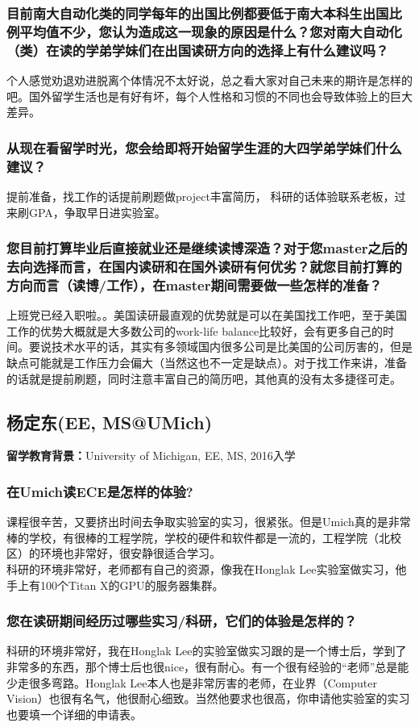 \documentclass[a4paper,UTF8]{book}
\begin{document}
    \subsubsection*{目前南大自动化类的同学每年的出国比例都要低于南大本科生出国比例平均值不少，您认为造成这一现象的原因是什么？您对南大自动化（类）在读的学弟学妹们在出国读研方向的选择上有什么建议吗？}
    个人感觉劝退劝进脱离个体情况不太好说，总之看大家对自己未来的期许是怎样的吧。国外留学生活也是有好有坏，每个人性格和习惯的不同也会导致体验上的巨大差异。

    \subsubsection*{从现在看留学时光，您会给即将开始留学生涯的大四学弟学妹们什么建议？}
    提前准备，找工作的话提前刷题做project丰富简历， 科研的话体验联系老板，过来刷GPA，争取早日进实验室。

    \subsubsection*{您目前打算毕业后直接就业还是继续读博深造？对于您master之后的去向选择而言，在国内读研和在国外读研有何优劣？就您目前打算的方向而言（读博/工作），在master期间需要做一些怎样的准备？}
    上班党已经入职啦。。美国读研最直观的优势就是可以在美国找工作吧，至于美国工作的优势大概就是大多数公司的work-life balance比较好，会有更多自己的时间。要说技术水平的话，其实有多领域国内很多公司是比美国的公司厉害的，但是缺点可能就是工作压力会偏大（当然这也不一定是缺点）。对于找工作来讲，准备的话就是提前刷题，同时注意丰富自己的简历吧，其他真的没有太多捷径可走。


\clearpage
\subsection{杨定东(EE, MS@UMich)}
    \textbf{留学教育背景：}University of Michigan, EE, MS, 2016入学

    \subsubsection*{在Umich读ECE是怎样的体验?}
    课程很辛苦，又要挤出时间去争取实验室的实习，很紧张。但是Umich真的是非常棒的学校，有很棒的工程学院，学校的硬件和软件都是一流的，工程学院（北校区）的环境也非常好，很安静很适合学习。\\
    科研的环境非常好，老师都有自己的资源，像我在Honglak Lee实验室做实习，他手上有100个Titan X的GPU的服务器集群。
    \subsubsection*{您在读研期间经历过哪些实习/科研，它们的体验是怎样的？}
    科研的环境非常好，我在Honglak Lee的实验室做实习跟的是一个博士后，学到了非常多的东西，那个博士后也很nice，很有耐心。有一个很有经验的“老师”总是能少走很多弯路。Honglak Lee本人也是非常厉害的老师，在业界（Computer Vision）也很有名气，他很耐心细致。当然他要求也很高，你申请他实验室的实习也要填一个详细的申请表。
\end{document}
